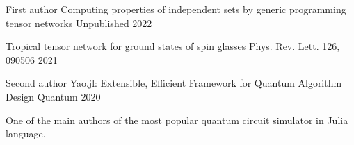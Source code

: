 \documentclass[11pt, a4paper]{awesome-cv}
\begin{document}
%
%
\begin{cventries}
  \cventry
    {First author} %
    {Computing properties of independent sets by generic programming tensor networks} %
    {Unpublished} %
    {2022} %
    {
      \begin{cvitems} %
        \item {}
      \end{cvitems}
    }
  {Tropical tensor network for ground states of spin glasses}
  {Phys. Rev. Lett. 126, 090506}
  {2021}
  {
      \begin{cvitems} %
        \item {}
      \end{cvitems}
  }
  \cventry
    {Second author} %
    {Yao.jl: Extensible, Efficient Framework for Quantum Algorithm Design} %
    {Quantum} %
    {2020} %
    {
      \begin{cvitems} %
        \item {One of the main authors of the most popular quantum circuit simulator in Julia language.}
      \end{cvitems}
    }
\end{cventries}
\end{document}
